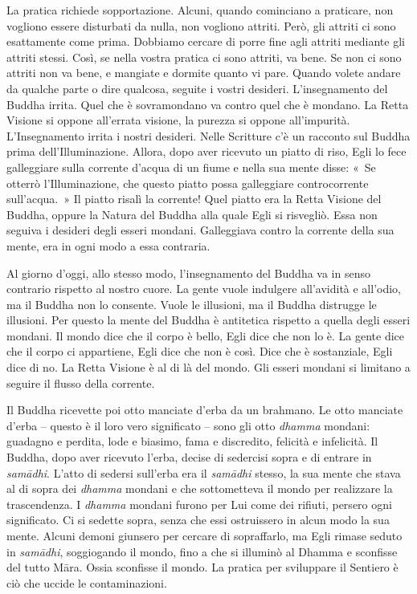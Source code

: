 La pratica richiede sopportazione. Alcuni, quando cominciano a
praticare, non vogliono essere disturbati da nulla, non vogliono
attriti. Però, gli attriti ci sono esattamente come prima. Dobbiamo
cercare di porre fine agli attriti mediante gli attriti stessi. Così, se
nella vostra pratica ci sono attriti, va bene. Se non ci sono attriti
non va bene, e mangiate e dormite quanto vi pare. Quando volete andare
da qualche parte o dire qualcosa, seguite i vostri desideri.
L'insegnamento del Buddha irrita. Quel che è sovramondano va contro
quel che è mondano. La Retta Visione si oppone all'errata visione, la
purezza si oppone all'impurità. L'Insegnamento irrita i nostri desideri.
Nelle Scritture c'è un racconto sul Buddha prima dell'Illuminazione.
Allora, dopo aver ricevuto un piatto di riso, Egli lo fece galleggiare
sulla corrente d'acqua di un fiume e nella sua mente disse: «~Se otterrò
l'Illuminazione, che questo piatto possa galleggiare controcorrente
sull'acqua.~» Il piatto risalì la corrente! Quel piatto era la Retta
Visione del Buddha, oppure la Natura del Buddha alla quale Egli si
risvegliò. Essa non seguiva i desideri degli esseri mondani. Galleggiava
contro la corrente della sua mente, era in ogni modo a essa contraria.

Al giorno d'oggi, allo stesso modo, l'insegnamento del Buddha va in
senso contrario rispetto al nostro cuore. La gente vuole indulgere
all'avidità e all'odio, ma il Buddha non lo consente. Vuole le
illusioni, ma il Buddha distrugge le illusioni. Per questo la mente del
Buddha è antitetica rispetto a quella degli esseri mondani. Il mondo
dice che il corpo è bello, Egli dice che non lo è. La gente dice che il
corpo ci appartiene, Egli dice che non è così. Dice che è sostanziale,
Egli dice di no. La Retta Visione è al di là del mondo. Gli esseri
mondani si limitano a seguire il flusso della corrente.

Il Buddha ricevette poi otto manciate d'erba da un brahmano. Le otto
manciate d'erba -- questo è il loro vero significato -- sono gli otto
\emph{dhamma} mondani: guadagno e perdita, lode e biasimo, fama e
discredito, felicità e infelicità. Il Buddha, dopo aver ricevuto l'erba,
decise di sedercisi sopra e di entrare in \emph{samādhi}. L'atto di
sedersi sull'erba era il \emph{samādhi} stesso, la sua mente che stava
al di sopra dei \emph{dhamma} mondani e che sottometteva il mondo per
realizzare la trascendenza. I \emph{dhamma} mondani furono per Lui come
dei rifiuti, persero ogni significato. Ci si sedette sopra, senza che
essi ostruissero in alcun modo la sua mente. Alcuni demoni giunsero per
cercare di sopraffarlo, ma Egli rimase seduto in \emph{samādhi},
soggiogando il mondo, fino a che si illuminò al Dhamma e sconfisse del
tutto Māra. Ossia sconfisse il mondo. La pratica per sviluppare il
Sentiero è ciò che uccide le contaminazioni.


